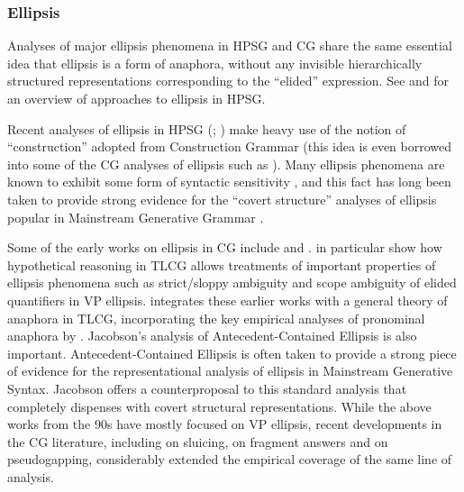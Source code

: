 \documentclass[output=paper
                ,modfonts
 	        ,biblatex
                ,babelshorthands
                ,newtxmath
                ,draftmode
                ,colorlinks, citecolor=brown
]{langscibook}
\begin{document}
\subsubsection{Ellipsis}

Analyses of major ellipsis phenomena in HPSG and CG share the same
essential idea that ellipsis is a form of anaphora, without any
invisible hierarchically structured representations corresponding to
the ``elided'' expression. See  and
\citet{ginzburg-miller-ellipsis-handbook} for an
overview of approaches to ellipsis in HPSG.

Recent analyses of ellipsis in HPSG (\citealt[Chapter~8]{GSag2000a-u}; \citealt{millereisspseudo})
make heavy use of the notion of ``construction'' adopted from
Construction Grammar (this idea is even borrowed into some of the CG
analyses of ellipsis such as \citealt{Jacobson2016}). Many ellipsis phenomena
are known to exhibit some form of syntactic sensitivity
\citep{kennedy2003,chung13,yoshida-ea-pg}, and this fact has long been
taken to provide strong evidence for the ``covert structure'' analyses
of ellipsis popular in Mainstream Generative Grammar \citep{merchant13}.

Some of the early works on ellipsis in CG include
\citet{hendriks-diss} and \citet{morrillmerenciano1996}.
\citet{morrillmerenciano1996} in particular show how hypothetical
reasoning in TLCG allows treatments of important properties of
ellipsis phenomena such as strict/sloppy ambiguity and scope ambiguity
of elided quantifiers in VP ellipsis. \citet{jaeger05} integrates
these earlier works with a general theory of anaphora in TLCG,
incorporating the key empirical analyses of pronominal anaphora by
\citet{Jacobson1999a,Jacobson2000a}. Jacobson's
\citeyearpar{Jacobson_p1998a,Jacobson2008} analysis of
Antecedent-Contained Ellipsis is also important. Antecedent-Contained
Ellipsis is often taken to provide a strong piece of evidence for the
representational analysis of ellipsis in Mainstream Generative Syntax.
Jacobson offers a counterproposal to this standard analysis that
completely dispenses with covert structural representations. While the
above works from the 90s have mostly focused on VP ellipsis, recent
developments in the CG literature, including \citet{barker-sluicing}
on sluicing, \citet{Jacobson2016} on fragment answers and
\citet{kubota-levine-pseudo} on pseudogapping, considerably extended
the empirical coverage of the same line of analysis.
\end{document}
